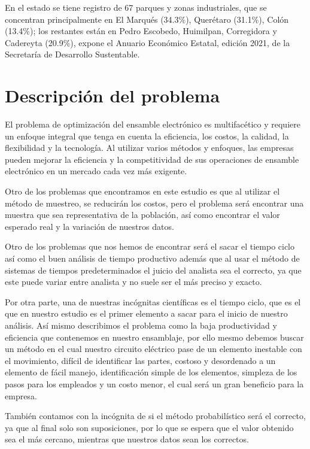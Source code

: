         En el estado se tiene registro de 67 parques y zonas industriales, que se concentran principalmente en El Marqués (34.3\%), Querétaro (31.1\%), Colón (13.4\%); los restantes están en Pedro Escobedo, Huimilpan, Corregidora y Cadereyta (20.9\%), expone el Anuario Económico Estatal, edición 2021, de la Secretaría de Desarrollo Sustentable.
    
    \section{Descripción del problema}
    
    El problema de optimización del ensamble electrónico es multifacético y requiere un enfoque integral que tenga en cuenta la eficiencia, los costos, la calidad, la flexibilidad y la tecnología. Al utilizar varios métodos y enfoques, las empresas pueden mejorar la eficiencia y la competitividad de sus operaciones de ensamble electrónico en un mercado cada vez más exigente.
    
    Otro de los problemas que encontramos en este estudio es que al utilizar el método de muestreo, se reducirán los costos, pero el problema será encontrar una muestra que sea representativa de la población, así como encontrar el valor esperado real y la variación de nuestros datos.
    
    Otro de los problemas que nos hemos de encontrar será el sacar el tiempo ciclo así como el buen análisis de tiempo productivo además que al usar el método de sistemas de tiempos predeterminados el juicio del analista sea el correcto, ya que este puede variar entre analista y no suele ser el más preciso y exacto.
    
    Por otra parte, una de nuestras incógnitas científicas es el tiempo ciclo, que es el que en nuestro estudio es el primer elemento a sacar para el inicio de nuestro análisis. Así mismo describimos el problema como la baja productividad y eficiencia que contenemos en nuestro ensamblaje, por ello mesmo debemos buscar un método en el cual nuestro circuito eléctrico pase de un elemento inestable con el movimiento, difícil de identificar las partes, costoso y desordenado a un elemento de fácil manejo, identificación simple de los elementos, simpleza de los pasos para los empleados y un costo menor, el cual será un gran beneficio para la empresa. 
    
    También contamos con la incógnita de si el método probabilístico será el correcto, ya que al final solo son suposiciones, por lo que se espera que el valor obtenido sea el más cercano, mientras que nuestros datos sean los correctos.
    
